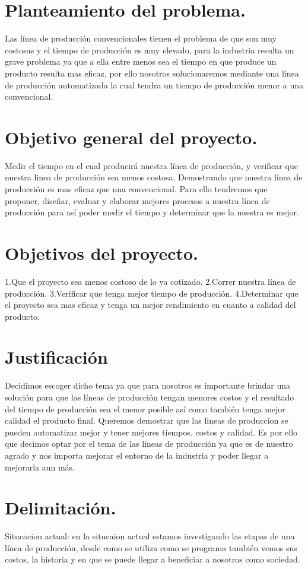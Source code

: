 \documentclass[10pt,a4paper]{article}
\begin{document}
\section{Planteamiento del problema.}
Las línea de producción convencionales tienen el problema de que son muy costosas y el tiempo de producción es muy elevado, para la industria resulta un grave problema ya que a ella entre menos sea el tiempo en que produce un producto resulta mas eficaz, por ello nosotros solucionaremos mediante una línea de producción automatizada la cual tendra un tiempo de producción menor a una convencional.  
\\
\section{Objetivo general del proyecto.}
Medir el tiempo en el cual producirá nuestra línea de producción, y verificar que nuestra linea de producción sea menos costosa.
Demostrando que nuestra línea de producción es mas eficaz que una convencional. Para ello tendremos que proponer, diseñar, evaluar y elaborar mejores procesos a nuestra línea de producción para así poder medir el tiempo y determinar que la nuestra es mejor. 
\section{Objetivos del proyecto.}
1.Que el proyecto sea menos costoso de lo ya cotizado.
2.Correr nuestra línea de producción.
3.Verificar que tenga mejor tiempo de producción.
4.Determinar que el proyecto sea mas eficaz y tenga un mejor rendimiento en cuanto a calidad del producto. 
\\
\section{Justificación}
Decidimos escoger dicho tema ya que para nosotros es importante brindar una solución para que las líneas de producción tengan menores costos y el resultado del tiempo de producción sea el menor posible así como también tenga mejor calidad el producto final.
Queremos demostrar que las lineas de produccion se pueden automatizar mejor y tener mejores tiempos, costos y calidad. Es por ello que decimos optar por el tema de las líneas de producción ya que es de nuestro agrado y nos importa mejorar el entorno de la industria y poder llegar a mejorarla aun más. 
\\ 
\section{Delimitación.}
Situcacion actual: en la situcaion actual estamos investigando las etapas de una línea de producción, desde como se utiliza como se programa también vemos sus costos, la historia y en que se puede llegar a beneficiar a nosotros como sociedad.
\end{document}
